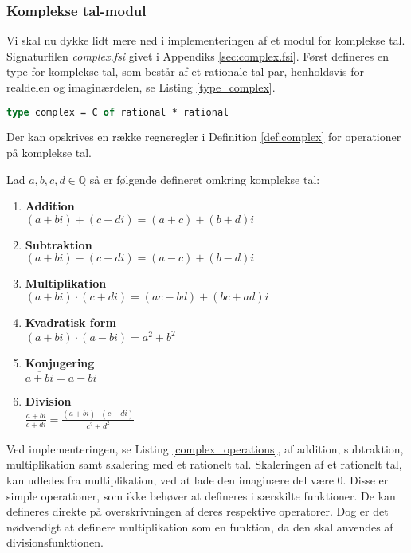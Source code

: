 \subsubsection{Komplekse tal-modul}
Vi skal nu dykke lidt mere ned i implementeringen af et modul for komplekse tal. Signaturfilen \textit{complex.fsi} givet i Appendiks \ref{sec:complex.fsi}. Først defineres en type for komplekse tal, som består af et rationale tal par, henholdsvis for realdelen og imaginærdelen, se Listing \ref{type_complex}.

\begin{lstlisting}[language={FSharp}, 
    label={type_complex},
    caption={Typen for komplekse tal}]
type complex = C of rational * rational
\end{lstlisting}

Der kan opskrives en række regneregler i Definition \ref{def:complex} for operationer på komplekse tal. 
\vspace{0.5cm}
\begin{definition}\label{def:complex}
  Lad $a, b, c, d \in \mathbb{Q}$ så er følgende defineret omkring komplekse tal:
  \begin{enumerate}
    \item \textbf{Addition} \\ $(a + bi) + (c + di) = (a + c) + (b + d)i$
    \item \textbf{Subtraktion} \\ $(a + bi) - (c + di) = (a - c) + (b - d)i$
    \item \textbf{Multiplikation} \\ $(a + bi) \cdot (c + di) = (ac - bd) + (bc + ad)i$
    \item \textbf{Kvadratisk form} \\ $ (a + bi) \cdot (a - bi) = a^2 + b^2$
    \item \textbf{Konjugering} \\ $\overline{a + bi} = a - bi$
    \item \textbf{Division} \\ $\frac{a + bi}{c + di} = \frac{(a + bi)\cdot(c - di)}{c^2 + d^2}$
  \end{enumerate}
\end{definition}

Ved implementeringen, se Listing \ref{complex_operations}, af addition, subtraktion, multiplikation samt skalering med et rationelt tal. Skaleringen af et rationelt tal, kan udledes fra multiplikation, ved at lade den imaginære del være $0$. Disse er simple operationer, som ikke behøver at defineres i særskilte funktioner. De kan defineres direkte på overskrivningen af deres respektive operatorer. Dog er det nødvendigt at definere multiplikation som en funktion, da den skal anvendes af divisionsfunktionen. 

